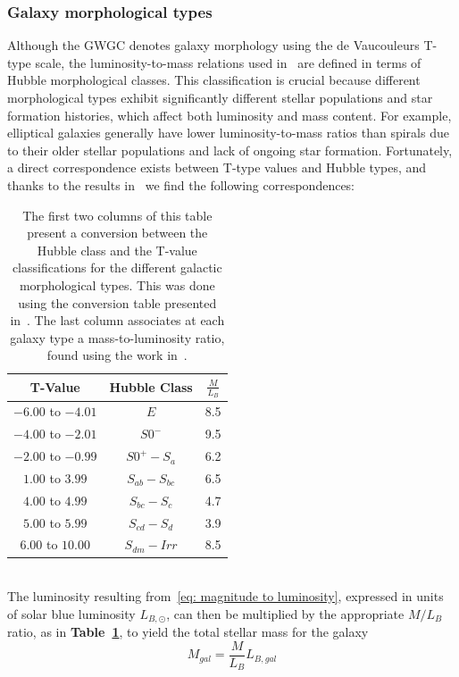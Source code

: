 \subsubsection{Galaxy morphological types}
Although the GWGC denotes galaxy morphology using the de Vaucouleurs T-type scale, the luminosity-to-mass relations used in~\cite{Faber&Gallagher} are defined in terms of Hubble morphological classes.
This classification is crucial because different morphological types exhibit significantly different stellar populations and star formation histories, which affect both luminosity and mass content.
For example, elliptical galaxies generally have lower luminosity-to-mass ratios than spirals due to their older stellar populations and lack of ongoing star formation.
Fortunately, a direct correspondence exists between T-type values and Hubble types, and thanks to the results in~\cite{Faber&Gallagher} we find the following correspondences:
\begin{table}[h!]
    \centering
    \begin{tabular}{ccc}
        T-Value & Hubble Class & $\frac{M}{L_B}$ \\
        \toprule
        $-6.00$ to $-4.01$ & $E$ & 8.5\\
        $-4.00$ to $-2.01$ & $S0^-$ & 9.5\\
        $-2.00$ to $-0.99$ & $S0^+-S_a$ & 6.2\\
        $1.00$ to $3.99$ & $S_{ab}-S_{bc}$ & 6.5\\
        $4.00$ to $4.99$ & $S_{bc}-S_{c}$ & 4.7\\
        $5.00$ to $5.99$ & $S_{cd}-S_{d}$ & 3.9\\
        $6.00$ to $10.00$ & $S_{dm}-Irr$ & 8.5\\
        \bottomrule
    \end{tabular}
    \caption{The first two columns of this table present a conversion between the Hubble class and the T-value classifications for the different galactic morphological types.
    This was done using the conversion table presented in~\cite{De_Vaucouleurs_1974}.
    The last column associates at each galaxy type a mass-to-luminosity ratio, found using the work in~\cite{Faber&Gallagher}.}\label{tab: mass luminosity conversions tab}
\end{table}
\vspace{3mm}\\
The luminosity resulting from~\eqref{eq: magnitude to luminosity}, expressed in units of solar blue luminosity $L_{B,\odot}$, can then be multiplied by the appropriate $M/L_B$ ratio, as in \textbf{Table~\ref{tab: mass luminosity conversions tab}}, to yield the total stellar mass for the galaxy
\begin{equation}
    M_{gal} = \frac{M}{L_B}L_{B,gal}
    \label{eq: total mass calculation}
\end{equation}


